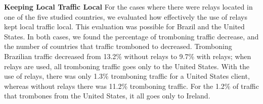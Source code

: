 {\bf Keeping Local Traffic Local}
For the cases where there were relays located in one of the five studied countries, we evaluated how effectively the use of relays kept local traffic local.  This evaluation was possible for Brazil and the United States.  In both cases, we found the percentage of tromboning traffic decrease, and the number of countries that traffic tromboned to decreased.  Tromboning Brazilian traffic decreased from 13.2\% without relays to 9.7\% with relays; when relays are used, all tromboning traffic goes only to the United States.  With the use of relays, there was only 1.3\% tromboning traffic for a United States client, whereas without relays there was 11.2\% tromboning traffic.  For the 1.2\% of traffic that trombones from the United States, it all goes only to Ireland.
